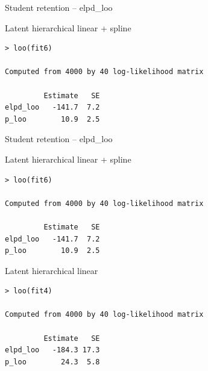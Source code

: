\documentclass[english,t]{beamer}
\begin{document}
\begin{frame}[fragile]{Student retention -- elpd\_loo}

Latent hierarchical linear + spline
{\small
\begin{lstlisting}
> loo(fit6)

Computed from 4000 by 40 log-likelihood matrix

         Estimate   SE
elpd_loo   -141.7  7.2
p_loo        10.9  2.5
\end{lstlisting}}

\end{frame}

\begin{frame}[fragile]{Student retention -- elpd\_loo}

Latent hierarchical linear + spline
{\small
\begin{lstlisting}
> loo(fit6)

Computed from 4000 by 40 log-likelihood matrix

         Estimate   SE
elpd_loo   -141.7  7.2
p_loo        10.9  2.5
\end{lstlisting}}

Latent hierarchical linear
{\small
\begin{lstlisting}
> loo(fit4)

Computed from 4000 by 40 log-likelihood matrix

         Estimate   SE
elpd_loo   -184.3 17.3
p_loo        24.3  5.8
\end{lstlisting}}

\end{frame}
\end{document}
